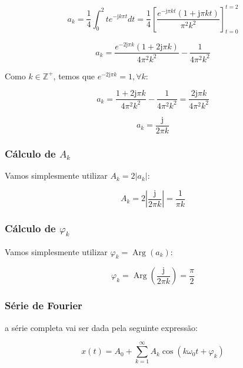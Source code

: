 \documentclass[10pt,twocolumn]{article}
\renewcommand{\j}{\ensuremath{\mathrm{j}}}
\newcommand{\op}[1]{\operatorname{#1}}
\newcommand{\abs}[1]{\left\vert#1\right\vert}
\newcommand{\Z}{\mathbb{Z}}
\newcommand{\?}{\stackrel{?}{=}}
\begin{document}
\begin{equation*}
	a_k=\frac{1}{4}\int_{0}^{2}te^{-\j k\pi t}dt=\frac{1}{4}\left[\frac{e^{-\j\pi kt}(1+\j\pi kt)}{\pi^2k^2}\right]_{t=0}^{t=2}
\end{equation*}

\begin{equation*}
	a_k=\frac{e^{-2\j\pi k}(1+2\j\pi k)}{4\pi^2k^2}-\frac{1}{4\pi^2k^2}
\end{equation*}

Como $k\in\Z^+$, temos que $e^{-2\j\pi k}=1, \forall k$:

\begin{equation*}
	a_k=\frac{1+2\j\pi k}{4\pi^2k^2}-\frac{1}{4\pi^2k^2}=\frac{2\j\pi k}{4\pi^2k^2}
\end{equation*}

\begin{equation*}
	a_k=\frac{\j}{2\pi k}
\end{equation*}

\subsubsection{Cálculo de $A_k $}

Vamos simplesmente utilizar $A_k=2\abs{a_k}$:

\begin{equation*}
	A_k=2\abs{\frac{\j}{2\pi k}}=\frac{1}{\pi k}
\end{equation*}

\subsubsection{Cálculo de $\varphi_k $}

Vamos simplesmente utilizar $\varphi_k=\op{Arg}(a_k)$:

\begin{equation*}
	\varphi_k=\op{Arg}\left(\frac{\j}{2\pi k}\right)=\frac{\pi}{2}
\end{equation*}

\subsubsection{Série de Fourier}

a série completa vai ser dada pela seguinte expressão:

\begin{equation*}
	x(t)=A_0+\sum_{k=1}^{\infty}A_k\cos\left(k\omega_0t+\varphi_k\right)
\end{equation*}
\end{document}
